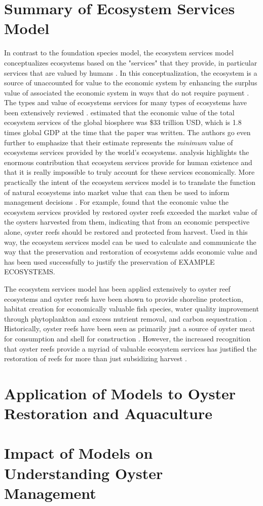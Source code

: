 \documentclass{article}
\begin{document}

\section{Summary of Ecosystem Services Model}

In contrast to the foundation species model, the ecosystem services model conceptualizes ecosystems based on the "services" that they provide, in particular services that are valued by humans \cite{}. In this conceptualization, the ecosystem is a source of unaccounted for value to the economic system by enhancing the surplus value of associated the economic system in ways that do not require payment \cite{}. The types and value of ecosystems services for many types of ecosystems have been extensively reviewed \cite{costanza_value_1998}.  estimated that the economic value of the total ecosystem services of the global biosphere was \$33 trillion USD, which is 1.8 times global GDP at the time that the paper was written. The authors go even further to emphasize that their estimate represents the \emph{minimum} value of ecosystems services provided by the world's ecosystems.  analysis highlights the enormous contribution that ecosystem services provide for human existence and that it is really impossible to truly account for these services economically. 
More practically the intent of the ecosystem services model is to translate the function of natural ecosystems into market value that can then be used to inform management decisions \cite{}. For example,  found that the economic value the ecosystem services provided by restored oyster reefs exceeded the market value of the oysters harvested from them, indicating that from an economic perspective alone, oyster reefs should be restored and protected from harvest. Used in this way, the ecosystem services model can be used to calculate and communicate the way that the preservation and restoration of ecosystems adds economic value \cite{} and has been used successfully to justify the preservation of EXAMPLE ECOSYSTEMS. 

The ecosystem services model has been applied extensively to oyster reef ecosystems and oyster reefs have been shown to provide shoreline protection, habitat creation for economically valuable fish species, water quality improvement through phytoplankton and excess nutrient removal, and carbon sequestration  \cite{coen_ecosystem_2007, grabowski_economic_2012}. Historically, oyster reefs have been seen as primarily just a source of oyster meat for consumption and shell for construction \cite{}. However, the increased recognition that oyster reefs provide a myriad of valuable ecosystem services has justified the restoration of reefs for more than just subsidizing harvest \cite{}. 

\section{Application of Models to Oyster Restoration and Aquaculture}

\section{Impact of Models on Understanding Oyster Management}



\end{document}
